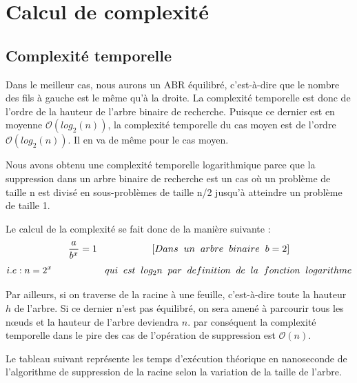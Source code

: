 \section{Calcul de complexité}
\subsection{Complexité temporelle}
Dans le meilleur cas, nous aurons un ABR équilibré, c’est-à-dire que le nombre des fils à gauche est le même qu’à la droite. La complexité temporelle est donc de l’ordre de la hauteur de l’arbre binaire de recherche. Puisque ce dernier est en moyenne $\mathcal{O}(log_2(n))$, la complexité temporelle du cas moyen est de l’ordre $\mathcal{O}(log_2(n))$. Il en va de même pour le cas moyen.
\par
Nous avons obtenu une complexité temporelle logarithmique parce que la suppression dans un arbre binaire de recherche est un cas où un problème de taille n est divisé en sous-problèmes de taille n/2 jusqu'à atteindre un problème de taille 1.
\par
Le calcul de la complexité se fait donc de la manière suivante :
$$ \frac {a}{b^x}=1  \hspace{2cm}[Dans\hspace{0.2cm} un\hspace{0.2cm} arbre\hspace{0.2cm} binaire\hspace{0.2cm} b = 2] $$
$$i.e : n=2^x\hspace{2cm} qui\hspace{0.2cm} est\hspace{0.2cm} log_2 n\hspace{0.2cm} par\hspace{0.2cm} definition\hspace{0.2cm} de\hspace{0.2cm} la\hspace{0.2cm} fonction\hspace{0.2cm} logarithme$$

\par
Par ailleurs, si on traverse de la racine à une feuille, c’est-à-dire toute la hauteur $h$ de l’arbre. Si ce dernier n’est pas équilibré, on sera amené à parcourir tous les nœuds et la hauteur de l’arbre deviendra $n$. par conséquent la complexité temporelle dans le pire des cas de l’opération de suppression est $\mathcal{O}(n)$.

Le tableau suivant représente les temps d'exécution théorique en nanoseconde de l'algorithme de suppression de la racine selon la variation de la taille de l'arbre.

